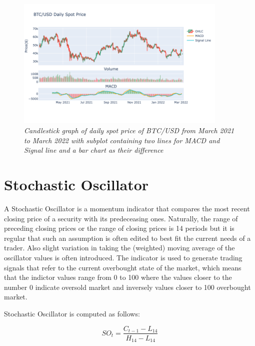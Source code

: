\begin{figure}[h]

\begin{center}
	\includegraphics[width=0.9\textwidth]{MACD.png}
\end{center}

\caption{\textit{ Candlestick graph of daily spot price of BTC/USD from March 2021 to March 2022 with subplot containing two lines for MACD and Signal line and a bar chart as their difference}}

\end{figure}

\section{Stochastic Oscillator}

	A Stochastic Oscillator is a momentum indicator that compares the most recent closing price of a security with its predeceasing ones. Naturally, the range of preceding closing prices or the range of closing prices is 14 periods but it is regular that such an assumption is often edited to best fit the current needs of a trader. Also slight variation in taking the (weighted) moving average of the oscillator values is often introduced. The indicator is used to generate trading signals that refer to the current overbought state of the market, which means that the indictor values range from 0 to 100 where the values closer to the number 0 indicate oversold market and inversely values closer to 100 overbought market. 
	
Stochastic Oscillator is computed as follows:

\begin{equation}
SO_{t} = \frac{C_{t-1} - L_{14}}{H_{14} - L_{14}}
\end{equation}

